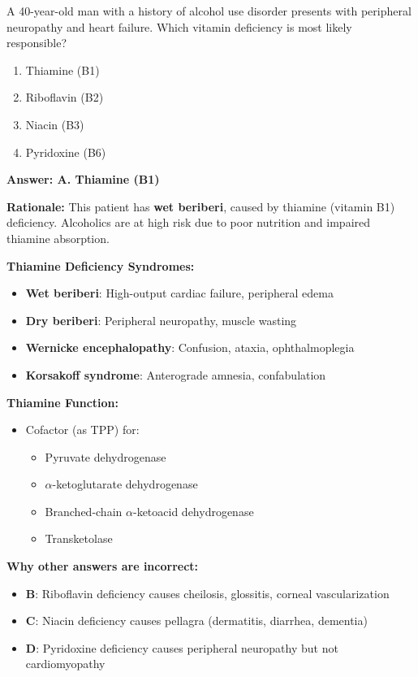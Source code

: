 \begin{exercise}
A 40-year-old man with a history of alcohol use disorder presents with peripheral neuropathy and heart failure. Which vitamin deficiency is most likely responsible?
\begin{enumerate}[label=\Alph*.]
    \item Thiamine (B1)
    \item Riboflavin (B2)
    \item Niacin (B3)
    \item Pyridoxine (B6)
\end{enumerate}
\end{exercise}

\begin{solution}
\textbf{Answer: A. Thiamine (B1)}

\textbf{Rationale:} This patient has \textbf{wet beriberi}, caused by thiamine (vitamin B1) deficiency. Alcoholics are at high risk due to poor nutrition and impaired thiamine absorption.

\textbf{Thiamine Deficiency Syndromes:}
\begin{itemize}
    \item \textbf{Wet beriberi}: High-output cardiac failure, peripheral edema
    \item \textbf{Dry beriberi}: Peripheral neuropathy, muscle wasting
    \item \textbf{Wernicke encephalopathy}: Confusion, ataxia, ophthalmoplegia
    \item \textbf{Korsakoff syndrome}: Anterograde amnesia, confabulation
\end{itemize}

\textbf{Thiamine Function:}
\begin{itemize}
    \item Cofactor (as TPP) for:
    \begin{itemize}
        \item Pyruvate dehydrogenase
        \item $\alpha$-ketoglutarate dehydrogenase
        \item Branched-chain $\alpha$-ketoacid dehydrogenase
        \item Transketolase
    \end{itemize}
\end{itemize}

\textbf{Why other answers are incorrect:}
\begin{itemize}
    \item \textbf{B}: Riboflavin deficiency causes cheilosis, glossitis, corneal vascularization
    \item \textbf{C}: Niacin deficiency causes pellagra (dermatitis, diarrhea, dementia)
    \item \textbf{D}: Pyridoxine deficiency causes peripheral neuropathy but not cardiomyopathy
\end{itemize}
\end{solution}

